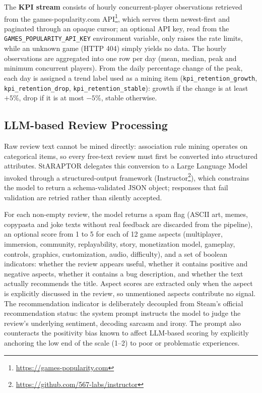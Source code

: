 The \textbf{KPI stream} consists of hourly concurrent-player observations retrieved from the games-popularity.com API\footnote{\url{https://games-popularity.com}}, which serves them newest-first and paginated through an opaque cursor; an optional API key, read from the \texttt{GAMES\_\allowbreak POPULARITY\_\allowbreak API\_\allowbreak KEY} environment variable, only raises the rate limits, while an unknown game (HTTP 404) simply yields no data. The hourly observations are aggregated into one row per day (mean, median, peak and minimum concurrent players). From the daily percentage change of the peak, each day is assigned a trend label used as a mining item (\texttt{kpi\_retention\_growth}, \texttt{kpi\_\allowbreak retention\_\allowbreak drop}, \texttt{kpi\_retention\_stable}): growth if the change is at least $+5\%$, drop if it is at most $-5\%$, stable otherwise.

\subsection{LLM-based Review Processing}
\label{sec:review_processing}

\noindent Raw review text cannot be mined directly: association rule mining operates on categorical items, so every free-text review must first be converted into structured attributes. StARAPTOR delegates this conversion to a Large Language Model invoked through a structured-output framework (Instructor\footnote{\url{https://github.com/567-labs/instructor}}), which constrains the model to return a schema-validated JSON object; responses that fail validation are retried rather than silently accepted.

For each non-empty review, the model returns a spam flag (ASCII art, memes, copypasta and joke texts without real feedback are discarded from the pipeline), an optional score from 1 to 5 for each of 12 game aspects (multiplayer, immersion, community, replayability, story, monetization model, gameplay, controls, graphics, customization, audio, difficulty), and a set of boolean indicators: whether the review appears useful, whether it contains positive and negative aspects, whether it contains a bug description, and whether the text actually recommends the title. Aspect scores are extracted only when the aspect is explicitly discussed in the review, so unmentioned aspects contribute no signal. The recommendation indicator is deliberately decoupled from Steam's official recommendation status: the system prompt instructs the model to judge the review's underlying sentiment, decoding sarcasm and irony. The prompt also counteracts the positivity bias known to affect LLM-based scoring by explicitly anchoring the low end of the scale (1--2) to poor or problematic experiences.

